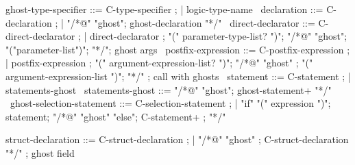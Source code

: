 \begin{syntax}

  ghost-type-specifier ::= C-type-specifier ;
  | {logic-type-name} \
  declaration ::= C-declaration ;
  | "/*@" "ghost";
     ghost-declaration "*/" \
  direct-declarator ::= C-direct-declarator ;
    | direct-declarator ;
    "(" parameter-type-list? ")";
        {"/*@" "ghost"};
          {"("parameter-list")"};
          {"*/"}; ghost args
        \
  postfix-expression ::= C-postfix-expression ;
    | postfix-expression ;
     "(" argument-expression-list? ")";
     {"/*@" "ghost"} ;
     {  "(" argument-expression-list ")"};
     {  "*/"} ; call with ghosts
    \
  statement ::= C-statement ;
             | statements-ghost \
  statements-ghost ::= "/*@" "ghost";
                       ghost-statement+ "*/" \
  ghost-selection-statement ::= C-selection-statement ;
    | "if" "(" expression ")";
       statement;
      {"/*@" "ghost" "else"};
      {  C-statement+ };
      {  "*/"} \

  struct-declaration ::= C-struct-declaration ;
  | {"/*@" "ghost" };
    {C-struct-declaration "*/"} ; ghost field

\end{syntax}

